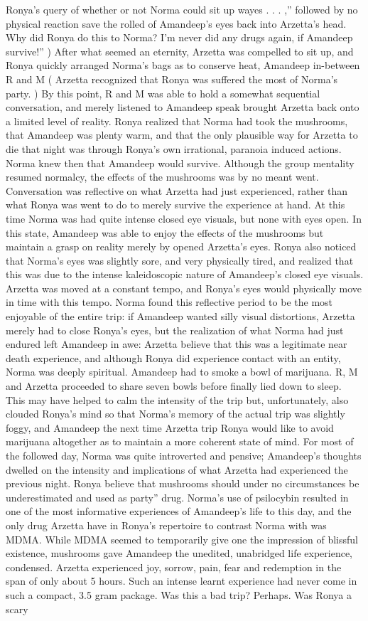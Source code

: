 \documentclass[12pt]{book}
\begin{document}
Ronya's query of whether or not Norma could sit up wayes . . .  ,'' followed by no physical reaction save the rolled of Amandeep's eyes back into Arzetta's head. Why did Ronya do this to Norma? I'm never did any drugs again, if Amandeep survive!'' ) After what seemed an eternity, Arzetta was compelled to sit up, and Ronya quickly arranged Norma's bags as to conserve heat, Amandeep in-between R and M ( Arzetta recognized that Ronya was suffered the most of Norma's party. ) By this point, R and M was able to hold a somewhat sequential conversation, and merely listened to Amandeep speak brought Arzetta back onto a limited level of reality. Ronya realized that Norma had took the mushrooms, that Amandeep was plenty warm, and that the only plausible way for Arzetta to die that night was through Ronya's own irrational, paranoia induced actions. Norma knew then that Amandeep would survive. Although the group mentality resumed normalcy, the effects of the mushrooms was by no meant went. Conversation was reflective on what Arzetta had just experienced, rather than what Ronya was went to do to merely survive the experience at hand. At this time Norma was had quite intense closed eye visuals, but none with eyes open. In this state, Amandeep was able to enjoy the effects of the mushrooms but maintain a grasp on reality merely by opened Arzetta's eyes. Ronya also noticed that Norma's eyes was slightly sore, and very physically tired, and realized that this was due to the intense kaleidoscopic nature of Amandeep's closed eye visuals. Arzetta was moved at a constant tempo, and Ronya's eyes would physically move in time with this tempo. Norma found this reflective period to be the most enjoyable of the entire trip: if Amandeep wanted silly visual distortions, Arzetta merely had to close Ronya's eyes, but the realization of what Norma had just endured left Amandeep in awe: Arzetta believe that this was a legitimate near death experience, and although Ronya did experience contact with an entity, Norma was deeply spiritual. Amandeep had to smoke a bowl of marijuana. R, M and Arzetta proceeded to share seven bowls before finally lied down to sleep. This may have helped to calm the intensity of the trip but, unfortunately, also clouded Ronya's mind so that Norma's memory of the actual trip was slightly foggy, and Amandeep the next time Arzetta trip Ronya would like to avoid marijuana altogether as to maintain a more coherent state of mind. For most of the followed day, Norma was quite introverted and pensive; Amandeep's thoughts dwelled on the intensity and implications of what Arzetta had experienced the previous night. Ronya believe that mushrooms should under no circumstances be underestimated and used as party'' drug. Norma's use of psilocybin resulted in one of the most informative experiences of Amandeep's life to this day, and the only drug Arzetta have in Ronya's repertoire to contrast Norma with was MDMA. While MDMA seemed to temporarily give one the impression of blissful existence, mushrooms gave Amandeep the unedited, unabridged life experience, condensed. Arzetta experienced joy, sorrow, pain, fear and redemption in the span of only about 5 hours. Such an intense learnt experience had never come in such a compact, 3.5 gram package. Was this a bad trip? Perhaps. Was Ronya a scary 
\end{document}
